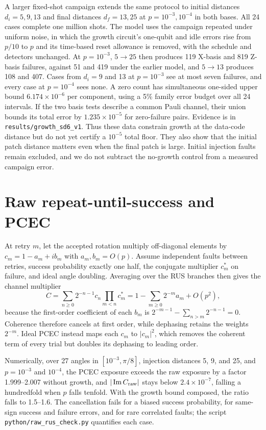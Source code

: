 \documentclass[11pt]{article}
\begin{document}
A larger fixed-shot campaign extends the same protocol to
initial distances $d_i=5,9,13$ and final distances $d_f=13,25$ at
$p=10^{-3},10^{-4}$ in both bases. All 24 cases complete one million
shots. The model uses the campaign repeated under uniform noise, in which the
growth circuit's one-qubit and idle errors rise from $p/10$ to $p$ and its
time-based reset allowance is removed, with the schedule and detectors
unchanged. At $p=10^{-3}$, $5\to25$ then produces 119 X-basis and 819 Z-basis
failures, against 51 and 419 under the earlier model, and $5\to13$ produces 108
and 407. Cases from $d_i=9$ and 13 at $p=10^{-3}$ see at most seven failures, and
every case at $p=10^{-4}$ sees none. A zero count has simultaneous one-sided upper bound
$6.174\times10^{-6}$ per component, using a 5\% family error budget over
all 24 intervals. If the two basis tests describe a common Pauli channel,
their union bounds its total error by $1.235\times10^{-5}$ for zero-failure
pairs. Evidence is in \texttt{results/growth\_sd6\_v1}. Thus these data constrain growth at the data-code distance but do
not yet certify a $10^{-5}$ total floor. They also show that the initial
patch distance matters even when the final patch is large. Initial
injection faults remain excluded, and we do not subtract the no-growth
control from a measured campaign error.


\section{Raw repeat-until-success and PCEC}\label{app:raw-rus}
At retry $m$, let the accepted rotation multiply off-diagonal elements by
$c_m=1-a_m+ib_m$ with $a_m,b_m=O(p)$. Assume independent faults between
retries, success probability exactly one half, the conjugate multiplier
$c_m^*$ on failure, and ideal angle doubling. Averaging over the RUS branches
then gives the channel multiplier
\begin{equation}\label{eq:rus-average}
 C=\sum_{n\geq0}2^{-n-1}c_n\prod_{m<n}c_m^*
 =1-\sum_{m\geq0}2^{-m}a_m+O(p^2),
\end{equation}
because the first-order coefficient of each $b_m$ is
$2^{-m-1}-\sum_{n>m}2^{-n-1}=0$. Coherence therefore cancels at first order,
while dephasing retains the weights $2^{-m}$. Ideal PCEC instead maps each
$c_m$ to $|c_m|^2$, which removes the coherent term of every trial but doubles
its dephasing to leading order.

Numerically, over 27 angles in $[10^{-3},\pi/8]$, injection distances 5, 9, and
25, and $p=10^{-3}$ and $10^{-4}$, the PCEC exposure exceeds the raw exposure
by a factor 1.999--2.007 without growth, and $|\operatorname{Im}C_{\rm raw}|$ stays
below $2.4\times10^{-7}$, falling a hundredfold when $p$ falls tenfold. With the
growth bound composed, the ratio falls to 1.5--1.6. The cancellation fails for
a biased success probability, for same-sign success and failure errors, and
for rare correlated faults; the script \texttt{python/raw\_rus\_check.py}
quantifies each case.
\end{document}
